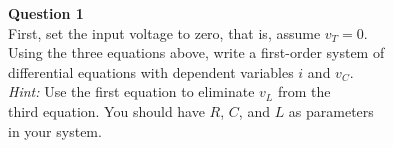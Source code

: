 \documentclass[preview]{standalone}
\begin{document}
\begin{center}
\textbf{Question 1} \\[10pt]
                    First, set the input voltage to zero, that is, assume $v_T = 0$. \\
                    Using the three equations above, write a first-order system of \\
                    differential equations with dependent variables $i$ and $v_C$. \\[5pt]
                    \textit{Hint:} Use the first equation to eliminate $v_L$ from the \\
                    third equation. You should have $R$, $C$, and $L$ as parameters \\
                    in your system.
\end{center}
\end{document}

